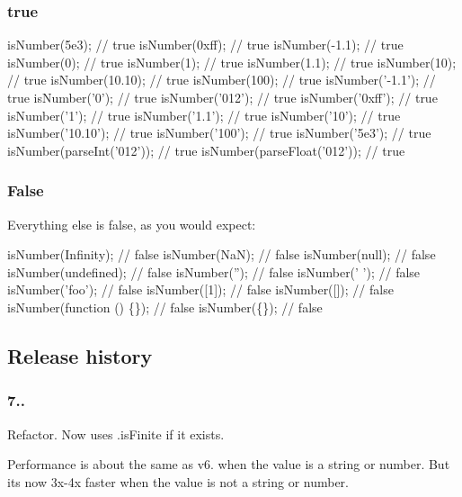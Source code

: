 \subsubsection*{true}


\begin{DoxyCode}
isNumber(5e3);               // true
isNumber(0xff);              // true
isNumber(-1.1);              // true
isNumber(0);                 // true
isNumber(1);                 // true
isNumber(1.1);               // true
isNumber(10);                // true
isNumber(10.10);             // true
isNumber(100);               // true
isNumber('-1.1');            // true
isNumber('0');               // true
isNumber('012');             // true
isNumber('0xff');            // true
isNumber('1');               // true
isNumber('1.1');             // true
isNumber('10');              // true
isNumber('10.10');           // true
isNumber('100');             // true
isNumber('5e3');             // true
isNumber(parseInt('012'));   // true
isNumber(parseFloat('012')); // true
\end{DoxyCode}


\subsubsection*{False}

Everything else is false, as you would expect\+:


\begin{DoxyCode}
isNumber(Infinity);          // false
isNumber(NaN);               // false
isNumber(null);              // false
isNumber(undefined);         // false
isNumber('');                // false
isNumber('   ');             // false
isNumber('foo');             // false
isNumber([1]);               // false
isNumber([]);                // false
isNumber(function () \{\});    // false
isNumber(\{\});                // false
\end{DoxyCode}


\subsection*{Release history}

\subsubsection*{7..}


\begin{DoxyItemize}
\item Refactor. Now uses {\ttfamily .is\+Finite} if it exists.
\item Performance is about the same as v6. when the value is a string or number. But it\textquotesingle{}s now 3x-\/4x faster when the value is not a string or number.
\end{DoxyItemize}

